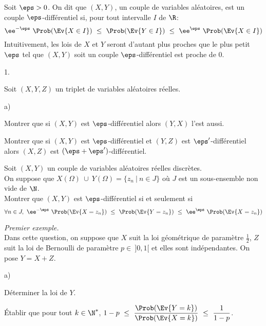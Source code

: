 \documentclass[11pt]{article}%
\begin{document}
\noindent
Soit $\eps>0$. On dit que $(X,Y)$, un couple de variables aléatoires,
est un couple $\eps$-différentiel si, pour tout intervalle $I$ de
$\R$:
\[
\ee^{-\eps} \ \Prob(\Ev{X\in I}) \ \leq \ \Prob(\Ev{Y \in I}) \ \leq \
\ee^{\eps} \ \Prob(\Ev{X\in I})
\]
Intuitivement, les lois de $X$ et $Y$ seront d'autant plus proches que
le plus petit $\eps$ tel que $(X,Y)$ soit un couple
$\eps$-différentiel est proche de $0$.
\begin{noliste}{1.}
  \setlength{\itemsep}{4mm} %
  \setcounter{enumi}{5}
\item Soit $(X,Y,Z)$ un triplet de variables aléatoires réelles.
  \begin{noliste}{a)}
    \setlength{\itemsep}{2mm} %
  \item Montrer que si $(X,Y)$ est $\eps$-différentiel alors $(Y,X)$
    l'est aussi.

    
    
    
    
    

  \item Montrer que si $(X,Y)$ est $\eps$-différentiel et $(Y,Z)$ est
    $\eps'$-différentiel alors $(X,Z)$ est $(\eps +
    \eps')$-différentiel.

    
  \end{noliste}

\item Soit $(X,Y)$ un couple de variables aléatoires réelles
  discrètes.\\
  On suppose que $X(\Omega) \ \cup \ Y(\Omega) = \{z_n \ |
  \ n\in J\}$ où $J$ est un sous-ensemble non vide de $\N$.\\[.2cm]
  Montrer que $(X,Y)$ est $\eps$-différentiel si et seulement si
  \[
  \forall n\in J, \ \ee^{-\eps} \ \Prob(\Ev{X=z_n}) \ \leq \
  \Prob(\Ev{Y=z_n}) \ \leq \ \ee^{\eps} \ \Prob(\Ev{X = z_n})
  \]

  

\item {\em Premier exemple.}\\
  Dans cette question, on suppose que $X$ suit la loi géométrique de
  paramètre $\frac{1}{2}$, $Z$ suit la loi de Bernoulli de paramètre
  $p \in \ ]0,1[$ et elles sont indépendantes. On pose $Y = X + Z$.
  \begin{noliste}{a)}
    \setlength{\itemsep}{2mm} %
  \item Déterminer la loi de $Y$.

    

  \item Établir que pour tout $k\in\N^*$, $1-p \ \leq \
    \dfrac{\Prob(\Ev{Y = k})}{\Prob(\Ev{X = k})} \ \leq \
    \dfrac{1}{1-p}$.


\end{noliste}
\end{noliste}
\end{document}
